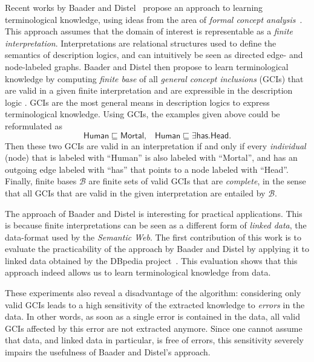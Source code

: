 \documentclass[english,fleqn]{scrartcl}
\begin{document}
Recent works by Baader and Distel~\cite{Diss-Felix} propose an approach to learning
terminological knowledge, using ideas from the area of \emph{formal concept
  analysis}~\cite{fca-book}.  This approach assumes that the domain of interest is
representable as a \emph{finite interpretation}.  Interpretations are relational
structures used to define the semantics of description logics, and can intuitively be seen
as directed edge- and node-labeled graphs.  Baader and Distel then propose to learn
terminological knowledge by computing \emph{finite base} of all \emph{general concept
  inclusions} (GCIs) that are valid in a given finite interpretation and are expressible
in the description logic \ELbot.  GCIs are the most general means in description logics to
express terminological knowledge.  Using GCIs, the examples given above could be
reformulated as
\begin{equation*}
  \mathsf{Human} \sqsubseteq \mathsf{Mortal}, \;\;\; \mathsf{Human} \sqsubseteq \exists
  \mathsf{has}. \mathsf{Head}.
\end{equation*}
Then these two GCIs are valid in an interpretation if and only if every \emph{individual}
(node) that is labeled with \enquote{\textsf{Human}} is also labeled with
\enquote{\textsf{Mortal}}, and has an outgoing edge labeled with \enquote{\textsf{has}}
that points to a node labeled with \enquote{\textsf{Head}}.  Finally, finite bases
$\mathcal{B}$ are finite sets of valid GCIs that are \emph{complete}, in the sense that
all GCIs that are valid in the given interpretation are entailed by $\mathcal{B}$.

The approach of Baader and Distel is interesting for practical applications.  This is
because finite interpretations can be seen as a different form of \emph{linked data}, the
data-format used by the \emph{Semantic Web}.  The first contribution of this work is to
evaluate the practicability of the approach by Baader and Distel by applying it to linked
data obtained by the DBpedia project~\cite{DBpedia}.  This evaluation shows that this
approach indeed allows us to learn terminological knowledge from data.

These experiments also reveal a disadvantage of the algorithm: considering only valid GCIs
leads to a high sensitivity of the extracted knowledge to \emph{errors} in the data.  In
other words, as soon as a single error is contained in the data, all valid GCIs affected
by this error are not extracted anymore.  Since one cannot assume that data, and linked
data in particular, is free of errors, this sensitivity severely impairs the usefulness of
Baader and Distel's approach.
\end{document}
